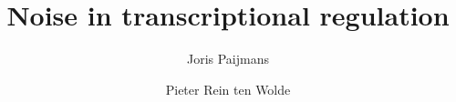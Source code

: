 \documentclass[a4paper,10pt]{article}
\begin{document}
\title{Noise in transcriptional regulation}

\author{Joris Paijmans \\ \AMOLF}
\author{Pieter Rein ten Wolde \\ \AMOLF}




%
%
%
%

\clearpage
\newpage
\appendix
{}
%
%
%

\clearpage
\newpage


\end{document}
